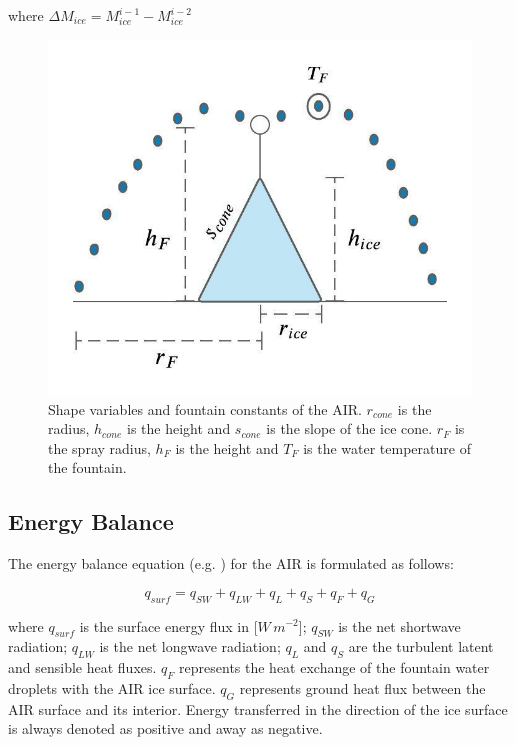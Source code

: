 \documentclass[utf8]{frontiersSCNS} %
\begin{document}
where $\Delta M_{ice} = M_{ice}^{i-1} - M_{ice}^{i-2}$

\begin{figure}
	\begin{center}
		\includegraphics[width=10
			cm]{Figures/shape_parameters.jpeg}
	\end{center}
	\caption{Shape variables and fountain constants of the AIR. $r_{cone}$ is
		the radius, $h_{cone}$ is the height and $s_{cone}$ is the slope of the ice cone. $r_F$ is the spray radius, $h_F$ is the
		height and $T_F$ is the water temperature of the fountain.}
	\label{fig:shape}
\end{figure}

\subsection{Energy Balance} \label{sec:energy}

The energy balance equation (e.g. \cite{Hock_2005}) for the AIR is formulated as follows:

\begin{equation} q_{surf} = q_{SW} + q_{LW} + q_{L} + q_{S} + q_{F} + q_{G}\label{eqn:EB} \end{equation}

where $q_{surf}$ is the surface energy flux in [$W\,m^{-2}$]; $q_{SW}$ is the net shortwave radiation; $q_{LW}$
is the net longwave radiation; $q_{L}$ and $q_{S}$ are the turbulent latent and sensible heat fluxes. $q_{F}$
represents the heat exchange of the fountain water droplets with the AIR ice surface. $q_{G}$ represents ground
heat flux between the AIR surface and its interior. Energy transferred in the direction of the ice surface is
always denoted as positive and away as negative.
\end{document}
